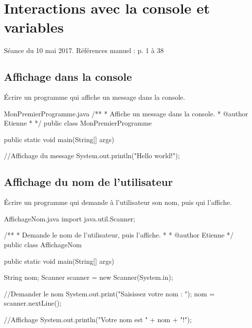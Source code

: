 \documentclass[12pt]{article}
\begin{document}

%
%
\section{Interactions avec la console et variables}
\vspace*{-\baselineskip}
Séance du 10 mai 2017. Références manuel : p. 1 à 38

\subsection{Affichage dans la console}

Écrire un programme qui affiche un message dans la console.

\begin{MyTCB}{MonPremierProgramme.java}
/**
 * Affiche un message dans la console.
 * @author Etienne
 *
 */ 
public class MonPremierProgramme {
	
	public static void main(String[] args) {
	
		//Affichage du message
		System.out.println("Hello world!");
		
	}

}
\end{MyTCB}
\newpage
%
%
%
%
%
\subsection{Affichage du nom de l'utilisateur}

Écrire un programme qui demande à l'utilisateur son nom, puis qui l'affiche.

\begin{MyTCB}{AffichageNom.java}
import java.util.Scanner;

/**
 * Demande le nom de l'utilisateur, puis l'affiche.
 * 
 * @author Etienne
 */
public class AffichageNom {

	public static void main(String[] args) {
		
		String nom;
		Scanner scanner = new Scanner(System.in);
		
		//Demander le nom
		System.out.print("Saisissez votre nom : ");
		nom = scanner.nextLine();
		
		//Affichage
		System.out.println("Votre nom est " + nom + "!");

	}

}
\end{MyTCB}
\newpage
%
%
%
%
%
\end{document}
